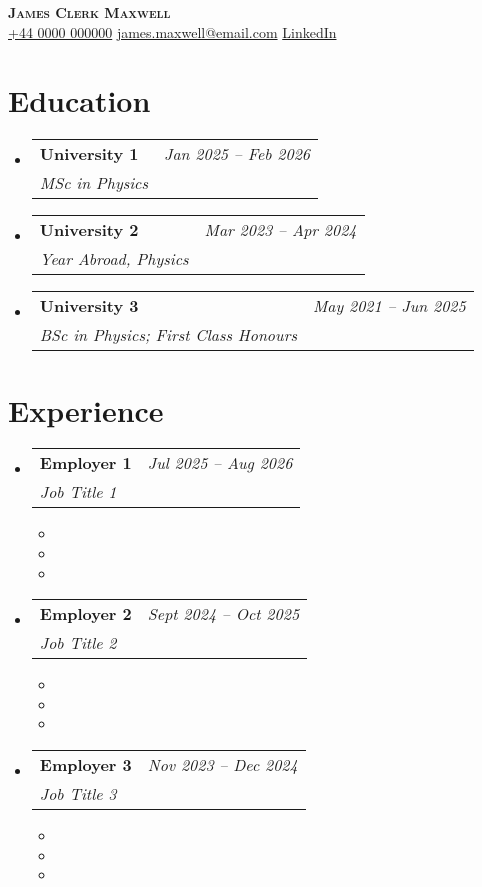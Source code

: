 \documentclass[a4paper,11pt]{article}
\makeatletter
\newcommand{\resumeItem}[1]{
  \item\small{{#1 \vspace{-2pt}}}
}
\newcommand{\resumeSubheading}[3]{
  \vspace{-2pt}\item
  \begin{tabular*}{0.97\textwidth}[t]{l@{\extracolsep{\fill}}r}
    \textbf{#1} & \textit{\small #3} \\
    \textit{\small #2} \\
  \end{tabular*}\vspace{-6pt}
}
\newcommand{\resumeEducationHeading}[3]{
  \vspace{-2pt}\item
  \begin{tabular*}{0.97\textwidth}[t]{l@{\extracolsep{\fill}}r}
    \textbf{#1} & \textit{\small #3} \\
    \textit{\small #2} \\
  \end{tabular*}\vspace{-5pt}
}
\newcommand{\resumeItemListStart}{\begin{itemize}}
\newcommand{\resumeItemListEnd}{\end{itemize}\vspace{-2pt}}
\newcommand{\resumeSubHeadingListStart}{\begin{itemize}[leftmargin=0.15in, label={}]}
\newcommand{\resumeSubHeadingListEnd}{\end{itemize}}
\makeatother
\begin{document}
\begin{center}
    \vspace{10pt}
    \textbf{\Huge \scshape James Clerk Maxwell} \\ \vspace{10pt}
    \small
    \faPhone \hspace{.5pt} \href{tel:+440000000000}{+44 0000 000000}
    \hspace{8pt}
    \faEnvelope \hspace{.5pt} \href{mailto:james.maxwell@email.com}{james.maxwell@email.com}
    \hspace{8pt}
    \faLinkedinSquare \hspace{.5pt} \href{https://www.linkedin.com/in/james-maxwell}{LinkedIn}
\end{center}

\section{Education}
\vspace{3pt}
\resumeSubHeadingListStart
  \resumeEducationHeading
    {University 1}{MSc in Physics}{Jan 2025 -- Feb 2026}
  \resumeEducationHeading
    {University 2}{Year Abroad, Physics}{Mar 2023 -- Apr 2024}
  \resumeEducationHeading
    {University 3}{BSc in Physics; First Class Honours}{May 2021 -- Jun 2025}
\resumeSubHeadingListEnd

\section{Experience}
\vspace{3pt}
\resumeSubHeadingListStart
  
  \resumeSubheading
    {Employer 1}{Job Title 1}{Jul 2025 -- Aug 2026}
  \resumeItemListStart
    \resumeItem{\lipsum[1][1-4]}
    \resumeItem{\lipsum[2][1-5]}
    \resumeItem{\lipsum[3][1-6]}
  \resumeItemListEnd

  \resumeSubheading
    {Employer 2}{Job Title 2}{Sept 2024 -- Oct 2025}
  \resumeItemListStart
    \resumeItem{\lipsum[4][1-5]}
    \resumeItem{\lipsum[5][1-4]}
    \resumeItem{\lipsum[6][1-6]}
  \resumeItemListEnd

  \resumeSubheading
    {Employer 3}{Job Title 3}{Nov 2023 -- Dec 2024}
  \resumeItemListStart
    \resumeItem{\lipsum[7][1-6]}
    \resumeItem{\lipsum[8][1-4]}
    \resumeItem{\lipsum[9][1-5]}
  \resumeItemListEnd

\resumeSubHeadingListEnd
\end{document}

